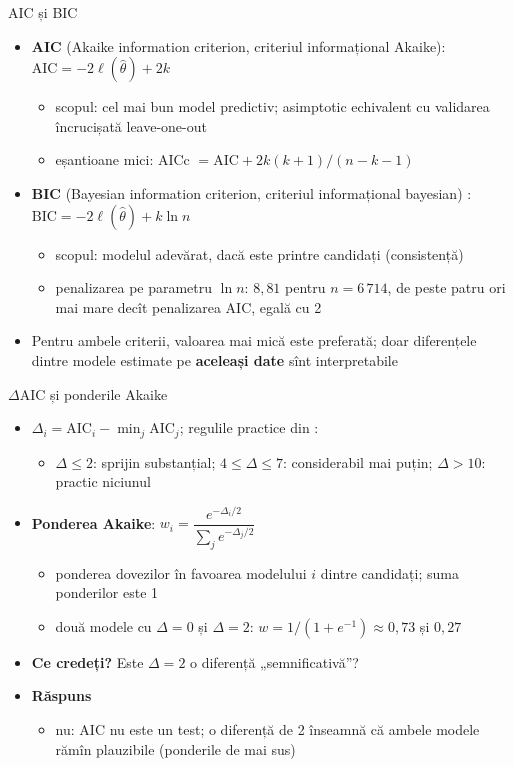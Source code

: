 \begin{frame}{AIC și BIC}
\itemsize{\small}
\begin{itemize}
    \item \textbf{AIC} (Akaike information criterion, criteriul informațional Akaike): $\mathrm{AIC} = -2\ell(\hat\theta) + 2k$
    \begin{itemize}
        \item scopul: cel mai bun model predictiv; asimptotic echivalent cu validarea încrucișată leave-one-out 
        \item eșantioane mici: AICc $= \mathrm{AIC} + 2k(k+1)/(n - k - 1)$ 
    \end{itemize}
    \item \textbf{BIC} (Bayesian information criterion, criteriul informațional bayesian) : $\mathrm{BIC} = -2\ell(\hat\theta) + k\ln n$
    \begin{itemize}
        \item scopul: modelul adevărat, dacă este printre candidați (consistență)
        \item penalizarea pe parametru $\ln n$: $8{,}81$ pentru $n = 6\,714$, de peste patru ori mai mare decît penalizarea AIC, egală cu 2
    \end{itemize}
    \item Pentru ambele criterii, valoarea mai mică este preferată; doar diferențele dintre modele estimate pe \textbf{aceleași date} sînt interpretabile
\end{itemize}
\end{frame}

\begin{frame}{$\Delta$AIC și ponderile Akaike}
\itemsize{\small}
\begin{itemize}
    \item $\Delta_i = \mathrm{AIC}_i - \min_j \mathrm{AIC}_j$; regulile practice din :
    \begin{itemize}
        \item $\Delta \le 2$: sprijin substanțial; $4 \le \Delta \le 7$: considerabil mai puțin; $\Delta > 10$: practic niciunul
    \end{itemize}
    \item \textbf{Ponderea Akaike}: $w_i = \dfrac{e^{-\Delta_i/2}}{\sum_j e^{-\Delta_j/2}}$
    \begin{itemize}
        \item ponderea dovezilor în favoarea modelului $i$ dintre candidați; suma ponderilor este 1
        \item două modele cu $\Delta = 0$ și $\Delta = 2$: $w = 1/(1 + e^{-1}) \approx 0{,}73$ și $0{,}27$
    \end{itemize}
    \item \textbf{Ce credeți?} Este $\Delta = 2$ o diferență „semnificativă”?
    \item \textbf{Răspuns}
    \begin{itemize}
        \item nu: AIC nu este un test; o diferență de 2 înseamnă că ambele modele rămîn plauzibile (ponderile de mai sus)
    \end{itemize}
\end{itemize}
\end{frame}

